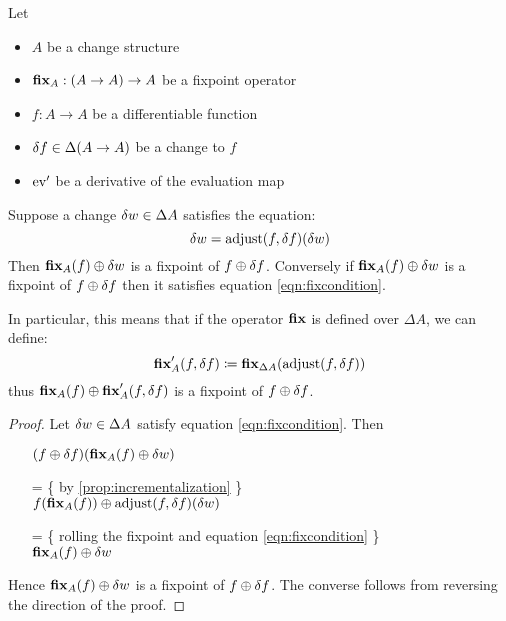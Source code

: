 \begin{thm}
\label{thm:fixpointDiff}
  Let 
  \begin{itemize}
    \item $A$ be a change structure
    \item$\textbf{fix}_A : (A \rightarrow A) \rightarrow A$ be a fixpoint operator
    \item $f: A \rightarrow A$ be a differentiable function
    \item $\delta f \in \Delta (A \rightarrow A)$ be a change to $f$
    \item $\operatorname{ev}'$ be a derivative of the evaluation map
  \end{itemize}

  Suppose a change $\delta w \in \Delta A$ satisfies
  the equation:
  \begin{equation}\label{eqn:fixcondition}
    \delta w = \operatorname{adjust}(f, \delta f)(\delta w)
  \end{equation}
  Then $\textbf{fix}_A(f) \oplus \delta w$ is a fixpoint of $f \oplus \delta f$. Conversely
  if $\textbf{fix}_A(f) \oplus \delta w$ is a fixpoint of $f \oplus \delta f$ then
  it satisfies equation \ref{eqn:fixcondition}.
  
  In particular, this means that 
  if the operator $\textbf{fix}$ is defined over $\Delta A$, we can define:
  $$
  \textbf{fix}_A'(f, \delta f) \coloneqq
  \textbf{fix}_{\Delta A}(\operatorname{adjust}(f, \delta f))
  $$
  thus $\textbf{fix}_A(f) \oplus \textbf{fix}_A'(f, \delta f)$ is a fixpoint 
  of $f \oplus \delta f$.
\end{thm}
\begin{proof}
  Let $\delta w \in \Delta A$ satisfy equation \ref{eqn:fixcondition}. Then
  \begin{itemize}
  \item[ ]
    $
    (f \oplus \delta f)(\textbf{fix}_A(f) \oplus \delta w)
    $
  \item[=]\{ by \ref{prop:incrementalization} \}\\
    $
    f(\textbf{fix}_A(f))
    \oplus
    \operatorname{adjust}(f, \delta f)(\delta w)
    $
  \item[=]\{ rolling the fixpoint and equation \ref{eqn:fixcondition} \}\\
    $
    \textbf{fix}_A(f)
    \oplus
    \delta w
    $
  \end{itemize}
  Hence $\textbf{fix}_A(f) \oplus \delta w$ is a fixpoint of $f \oplus \delta f$. The converse
  follows from reversing the direction of the proof.
\end{proof}

